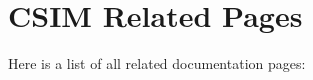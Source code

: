 \section{CSIM Related Pages}
Here is a list of all related documentation pages:\begin{CompactList}
\item {}

\end{CompactList}
